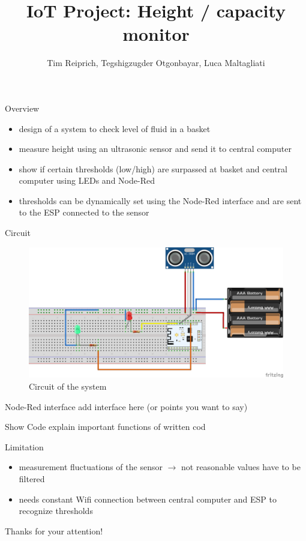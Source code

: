 \documentclass[11pt]{beamer}
\author{Tim Reiprich, Tegshigzugder Otgonbayar, Luca Maltagliati}
\title{IoT Project: Height / capacity monitor}
\begin{document}
\begin{frame}
\titlepage
\end{frame}


\begin{frame}{Overview}
\begin{itemize}
\item design of a system to check level of fluid in a basket
\item measure height using an ultrasonic sensor and send it to central computer
\item show if certain thresholds (low/high) are surpassed at basket and central computer using LEDs and Node-Red
\item thresholds can be dynamically set using the Node-Red interface and are sent to the ESP connected to the sensor
\end{itemize}
\end{frame}

\begin{frame}{Circuit}
\begin{figure}
\hspace*{-0.5cm}\includegraphics[scale=0.5]{pic/schema_bb.png}
\caption{Circuit of the system}
\label{schema_bb}
\end{figure}
\end{frame}

\begin{frame}{Node-Red interface}
add interface here (or points you want to say)
\end{frame}

\begin{frame}{Show Code}
explain important functions of written cod
\end{frame}

\begin{frame}{Limitation}
\begin{itemize}
\item measurement fluctuations of the sensor $\to$ not reasonable values have to be filtered
\item needs constant Wifi connection between central computer and ESP to recognize thresholds
\end{itemize}
\end{frame}

\begin{frame}{}
\center
\huge{Thanks for your attention!}
\end{frame}
\end{document}
